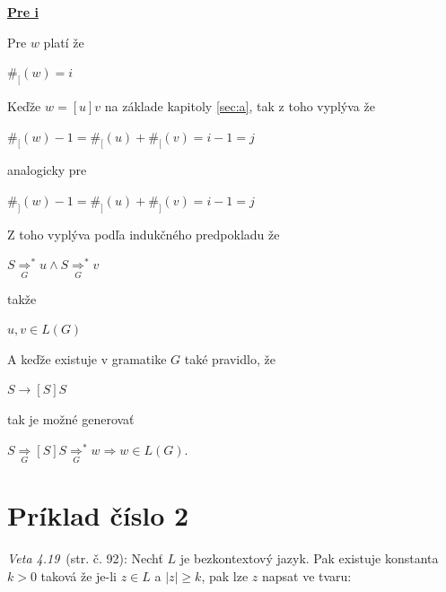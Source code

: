 \documentclass[11pt,a4paper]{article}
\begin{document}
\newpage
\underline{\textbf{Pre i}}
\begin{flushright}
\begin{minipage}{0.95\textwidth}

    Pre $w$ platí že

    \begin{center}
        $\#_[(w) = i$
    \end{center}

    Keďže $w=[u]v$ na základe kapitoly \ref{sec:a}, tak z toho vyplýva že

    \begin{center}
    $\#_[(w) - 1 = \#_[(u) + \#_[(v) = i-1 = j$
    \end{center}

    analogicky pre

    \begin{center}
    $\#_](w) - 1 = \#_](u) + \#_](v) = i-1 = j$
    \end{center}

    Z toho vyplýva podľa indukčného predpokladu že

    \begin{center}
    $S {\underset{G}{\Rightarrow}}^* u \wedge S {\underset{G}{\Rightarrow}}^* v$
    \end{center}

    takže

    \begin{center}
    $u,v \in L(G)$
    \end{center}

    A keďže existuje v gramatike $G$ také pravidlo, že

    \begin{center}
        $S \rightarrow [S]S$
    \end{center}

    tak je možné generovať
    \begin{center}
        $S {\underset{G}{\Rightarrow}} [S]S {\underset{G}{\Rightarrow}}^* w \Rightarrow w \in L(G)$.
    \end{center}
\end{minipage}
\end{flushright}

\newpage
\section{Príklad číslo 2} %

\textit{Veta 4.19}~\cite{TIN}(str. č. 92): Nechť $L$ je bezkontextový jazyk. Pak existuje konstanta $k>0$ taková že je-li $z \in L$ a $|z| \geq k$, pak lze $z$ napsat ve tvaru:
\end{document}
